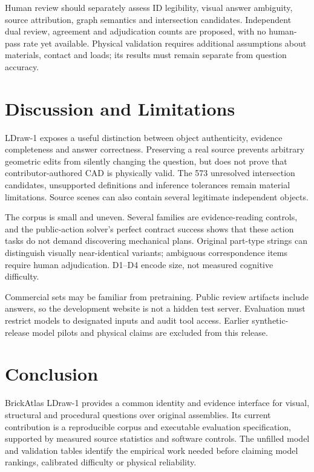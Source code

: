 \documentclass[10pt,twocolumn,letterpaper]{article}
\begin{document}
Human review should separately assess ID legibility, visual answer
ambiguity, source attribution, graph semantics and intersection
candidates. Independent dual review, agreement and adjudication counts
are proposed, with no human-pass rate yet available. Physical validation
requires additional assumptions about materials, contact and loads;
its results must remain separate from question accuracy.

\section{Discussion and Limitations}
LDraw-1 exposes a useful distinction between object authenticity,
evidence completeness and answer correctness. Preserving a real source
prevents arbitrary geometric edits from silently changing the question,
but does not prove that contributor-authored CAD is physically valid.
The 573 unresolved intersection candidates, unsupported definitions and
inference tolerances remain material limitations. Source scenes can
also contain several legitimate independent objects.

The corpus is small and uneven. Several families are evidence-reading
controls, and the public-action solver's perfect contract success shows
that these action tasks do not demand discovering mechanical plans.
Original part-type strings can distinguish visually near-identical
variants; ambiguous correspondence items require human adjudication.
D1--D4 encode size, not measured cognitive difficulty.

Commercial sets may be familiar from pretraining. Public review
artifacts include answers, so the development website is not a hidden
test server. Evaluation must restrict models to designated inputs and
audit tool access. Earlier synthetic-release model pilots and physical
claims are excluded from this release.

\section{Conclusion}
BrickAtlas LDraw-1 provides a common identity and evidence interface for
visual, structural and procedural questions over original assemblies.
Its current contribution is a reproducible corpus and executable
evaluation specification, supported by measured source statistics and
software controls. The unfilled model and validation tables identify
the empirical work needed before claiming model rankings, calibrated
difficulty or physical reliability.



\end{document}

